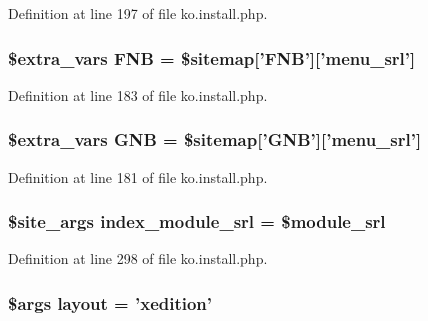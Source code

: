 Definition at line 197 of file ko.\-install.\-php.

\hypertarget{ko_8install_8php_a683e060c22be3e658be6f9751a2082f0}{
\subsubsection[{F\-N\-B}]{\setlength{\rightskip}{0pt plus 5cm}\${\bf extra\-\_\-vars} F\-N\-B = \$sitemap\mbox{[}'F\-N\-B'\mbox{]}\mbox{[}'menu\-\_\-srl'\mbox{]}}}\label{ko_8install_8php_a683e060c22be3e658be6f9751a2082f0}


Definition at line 183 of file ko.\-install.\-php.

\hypertarget{ko_8install_8php_a9b1716b68fc04f3492448f38148dcbf5}{
\subsubsection[{G\-N\-B}]{\setlength{\rightskip}{0pt plus 5cm}\${\bf extra\-\_\-vars} G\-N\-B = \$sitemap\mbox{[}'G\-N\-B'\mbox{]}\mbox{[}'menu\-\_\-srl'\mbox{]}}}\label{ko_8install_8php_a9b1716b68fc04f3492448f38148dcbf5}


Definition at line 181 of file ko.\-install.\-php.

\hypertarget{ko_8install_8php_acd0b17bfe6d14c82871d73fa39c9c22d}{
\subsubsection[{index\-\_\-module\-\_\-srl}]{\setlength{\rightskip}{0pt plus 5cm}\$site\-\_\-args index\-\_\-module\-\_\-srl = \${\bf module\-\_\-srl}}}\label{ko_8install_8php_acd0b17bfe6d14c82871d73fa39c9c22d}


Definition at line 298 of file ko.\-install.\-php.

\hypertarget{ko_8install_8php_a0dc2cdff7167f362443808ff71ae5177}{
\subsubsection[{layout}]{\setlength{\rightskip}{0pt plus 5cm}\$args {\bf layout} = 'xedition'}}\label{ko_8install_8php_a0dc2cdff7167f362443808ff71ae5177}


